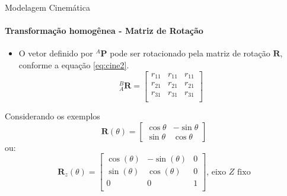\documentclass{beamer}
\begin{document}
\begin{frame}{Modelagem Cinemática}
    \framesubtitle{Transformação homogênea - Matriz de Rotação}
    \begin{itemize}
        \item O vetor definido por ${}^A\mathbf{P}$ pode ser rotacionado pela matriz de rotação $\mathbf{R}$, conforme a equação \eqref{eq:cine2}.
              \begin{equation}\label{eq:cine2}
                  {}_A^B
                  \mathbf{R} =
                  \begin{bmatrix}
                      r_{11} & r_{11} & r_{11} \\
                      r_{21} & r_{21} & r_{21} \\
                      r_{31} & r_{31} & r_{31} \\
                  \end{bmatrix}
              \end{equation}
    \end{itemize}

    \begin{block}{Considerando os exemplos}
        \begin{equation*}
            \mathbf{R}(\theta) =
            \begin{bmatrix}
                \cos \theta & -\sin \theta \\\sin \theta &\cos \theta
            \end{bmatrix}
        \end{equation*}
        ou:
        \begin{equation*}
            \mathbf{R}_z(\theta) =
            \begin{bmatrix}
                \cos(\theta) & -\sin(\theta) & 0 \\
                \sin(\theta) & \cos(\theta) & 0 \\
                0            & 0            & 1 \\
            \end{bmatrix} \text{, eixo $Z$ fixo}
        \end{equation*}
    \end{block}

\end{frame}
\end{document}
